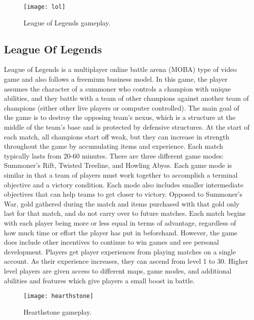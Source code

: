 \begin{figure}[h]
\centering
\texttt{[image: lol]}
\caption{League of Legends gameplay.}
\end{figure}

\subsection{League Of Legends}
League of Legends is a multiplayer online battle arena (MOBA) type of video game and also follows a freemium business model. \cite{LeagueOfLegends} In this game, the player assumes the character of a summoner who controls a champion with unique abilities, and they battle with a team of other champions against another team of champions (either other live players or computer controlled). The main goal of the game is to destroy the opposing team's nexus, which is a structure at the middle of the team's base and is protected by defensive structures. At the start of each match, all champions start off weak, but they can increase in strength throughout the game by accumulating items and experience. Each match typically lasts from 20-60 minutes. There are three different game modes: Summoner's Rift, Twisted Treeline, and Howling Abyss. Each game mode is similar in that a team of players must work together to accomplish a terminal objective and a victory condition. Each mode also includes smaller intermediate objectives that can help teams to get closer to victory. 
	Opposed to Summoner's War, gold gathered during the match and items purchased with that gold only last for that match, and do not carry over to future matches. Each match begins with each player being more or less equal in terms of advantage, regardless of how much time or effort the player has put in beforehand. 
	However, the game does include other incentives to continue to win games and see personal development. Players get player experiences from playing matches on a single account. As their experience increases, they can ascend from level 1 to 30. Higher level players are given access to different maps, game modes, and additional abilities and features which give players a small boost in battle. 
	
\begin{figure}[h]
\centering
\texttt{[image: hearthstone]}
\caption{Hearthstone gameplay.}
\end{figure}	
